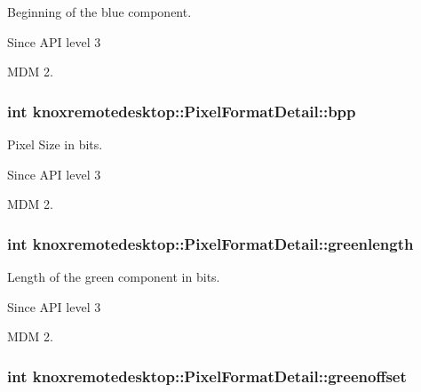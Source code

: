 \-Beginning of the blue component. 

\begin{DoxySince}{\-Since}
\-A\-P\-I level 3 

\-M\-D\-M 2. 
\end{DoxySince}
\hypertarget{structknoxremotedesktop_1_1PixelFormatDetail_a9557bebcc969ba20502ba9d377e085dc}{
\subsubsection[{bpp}]{\setlength{\rightskip}{0pt plus 5cm}int {\bf knoxremotedesktop\-::\-Pixel\-Format\-Detail\-::bpp}}}\label{structknoxremotedesktop_1_1PixelFormatDetail_a9557bebcc969ba20502ba9d377e085dc}


\-Pixel \-Size in bits. 

\begin{DoxySince}{\-Since}
\-A\-P\-I level 3 

\-M\-D\-M 2. 
\end{DoxySince}
\hypertarget{structknoxremotedesktop_1_1PixelFormatDetail_a87f98032962d81ee015a6a0c56ec6290}{
\subsubsection[{greenlength}]{\setlength{\rightskip}{0pt plus 5cm}int {\bf knoxremotedesktop\-::\-Pixel\-Format\-Detail\-::greenlength}}}\label{structknoxremotedesktop_1_1PixelFormatDetail_a87f98032962d81ee015a6a0c56ec6290}


\-Length of the green component in bits. 

\begin{DoxySince}{\-Since}
\-A\-P\-I level 3 

\-M\-D\-M 2. 
\end{DoxySince}
\hypertarget{structknoxremotedesktop_1_1PixelFormatDetail_ab334f70ccc320d17dc86a28730954964}{
\subsubsection[{greenoffset}]{\setlength{\rightskip}{0pt plus 5cm}int {\bf knoxremotedesktop\-::\-Pixel\-Format\-Detail\-::greenoffset}}}\label{structknoxremotedesktop_1_1PixelFormatDetail_ab334f70ccc320d17dc86a28730954964}


